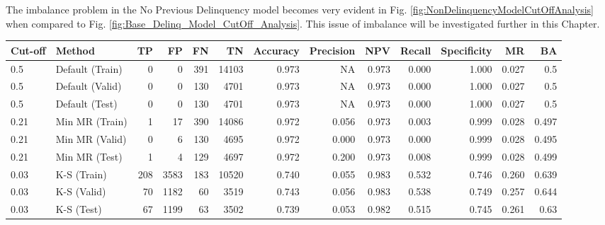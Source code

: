 The imbalance problem in the No Previous Delinquency model becomes very evident in Fig.  \ref{fig:NonDelinquencyModelCutOffAnalysis} when compared to Fig. \ref{fig:Base_Delinq_Model_CutOff_Analysis}. This issue of imbalance will be investigated further in this Chapter.

\begin{table}[H]
	\centering
	\resizebox{\textwidth}{!}
	{
	\begin{tabular}{l|l|r|r|r|r|r|r|r|r|r|r|r}
		\hline
		\textbf{Cut-off} & \textbf{Method} & \textbf{TP} & \textbf{FP} & \textbf{FN} & \textbf{TN} & \textbf{Accuracy} & \textbf{Precision} & \textbf{NPV} & \textbf{Recall} & \textbf{Specificity} & \textbf{MR} & \textbf{BA}  \\ \hline
		0.5             & Default (Train) & 0           & 0           & 391         & 14103       & 0.973             & NA                 & 0.973        & 0.000           & 1.000                & 0.027   & 0.5    \\
		0.5             & Default (Valid) & 0           & 0           & 130         & 4701        & 0.973             & NA                 & 0.973        & 0.000           & 1.000                & 0.027  & 0.5     \\
		0.5             & Default (Test)  & 0           & 0           & 130         & 4701        & 0.973             & NA          & 0.973        & 0.000           & 1.000                & 0.027  & 0.5     \\ \hline
		
		0.21            & Min MR (Train)  & 1           & 17          & 390         & 14086       & 0.972             & 0.056              & 0.973        & 0.003           & 0.999                & 0.028    & 0.497   \\
		0.21            & Min MR (Valid)  & 0           & 6           & 130         & 4695        & \cellcolor{yellow!25}0.972             & 0.000              & 0.973        & 0.000           & \cellcolor{yellow!25}0.999                & \cellcolor{yellow!25}0.028    & 0.495   \\
		0.21            & Min MR (Test)   & 1           & 4           & 129         & 4697        & 0.972             & 0.200              & 0.973        & 0.008           & 0.999                & 0.028  & 0.499     \\ \hline
		
		0.03            & K-S (Train)     & 208         & 3583        & 183         & 10520       & 0.740             & 0.055              & 0.983        & 0.532           & 0.746                & 0.260    &  0.639  \\
		0.03            & K-S (Valid)      & 70          & 1182        & 60          & 3519        & 0.743             & 0.056              & \cellcolor{yellow!25}0.983        & \cellcolor{yellow!25}0.538           & 0.749                & 0.257  & \cellcolor{yellow!25}0.644     \\
		0.03            & K-S (Test)     & 67          & 1199        & 63          & 3502        & 0.739             & 0.053              & 0.982        & 0.515           & 0.745                & 0.261  & 0.63     \\ \hline
		

\end{tabular}}
\end{table}
